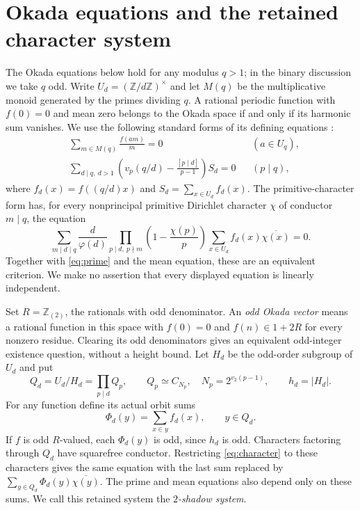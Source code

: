 \documentclass[11pt]{amsart}
\theoremstyle{definition}
\theoremstyle{remark}
\newcommand{\Z}{\mathbb Z}
\newcommand{\Zt}{\mathbb Z_{(2)}}
\numberwithin{equation}{section}
\begin{document}
\section{Okada equations and the retained character system}
The Okada equations below hold for any modulus $q>1$; in the binary
discussion we take $q$ odd. Write $U_d=(\Z/d\Z)^\times$ and let $M(q)$ be the
multiplicative monoid generated by the primes dividing $q$. A rational
periodic function with $f(0)=0$ and mean zero belongs to the Okada space
if and only if its harmonic sum vanishes. We use the following standard
forms of its defining equations \cite{Okada,MP,Bha}:
\begin{align}
 &\sum_{m\in M(q)}\frac{f(am)}m=0 &&(a\in U_q),\label{eq:unit}\\
 &\sum_{d\mid q,\ d>1}
 \left(v_p(q/d)-\frac{[p\mid d]}{p-1}\right)S_d=0
 &&(p\mid q),\label{eq:prime}
\end{align}
where $f_d(x)=f((q/d)x)$ and $S_d=\sum_{x\in U_d}f_d(x)$.
The primitive-character form has, for every nonprincipal primitive
Dirichlet character $\chi$ of conductor $m\mid q$, the equation
\begin{equation}\label{eq:character}
 \sum_{m\mid d\mid q}\frac d{\varphi(d)}
 \prod_{p\mid d,\ p\nmid m}\left(1-\frac{\chi(p)}p\right)
 \sum_{x\in U_d}f_d(x)\overline{\chi(x)}=0.
\end{equation}
Together with \eqref{eq:prime} and the mean equation, these are an
equivalent criterion. We make no assertion that every displayed equation
is linearly independent.

Set $R=\Zt$, the rationals with odd denominator. An \emph{odd Okada vector}
means a rational function in this space with $f(0)=0$ and
$f(n)\in1+2R$ for every nonzero residue. Clearing its odd denominators
gives an equivalent odd-integer existence question, without a height bound.
Let $H_d$ be the odd-order subgroup of $U_d$ and put
\[
 Q_d=U_d/H_d=\prod_{p\mid d}Q_p,\qquad
 Q_p\simeq C_{N_p},\quad N_p=2^{v_2(p-1)},\qquad h_d=|H_d|.
\]
For any function define its actual orbit sums
\begin{equation}\label{eq:orbit}
 \Phi_d(y)=\sum_{x\in y}f_d(x),\qquad y\in Q_d.
\end{equation}
If $f$ is odd $R$-valued, each $\Phi_d(y)$ is odd, since $h_d$ is odd.
Characters factoring through $Q_d$ have squarefree conductor. Restricting
\eqref{eq:character} to these characters gives the same equation with
the last sum replaced by $\sum_{y\in Q_d}\Phi_d(y)\overline{\chi(y)}$.
The prime and mean equations also depend only on these sums. We call
this retained system the \emph{$2$-shadow system}.
\end{document}
